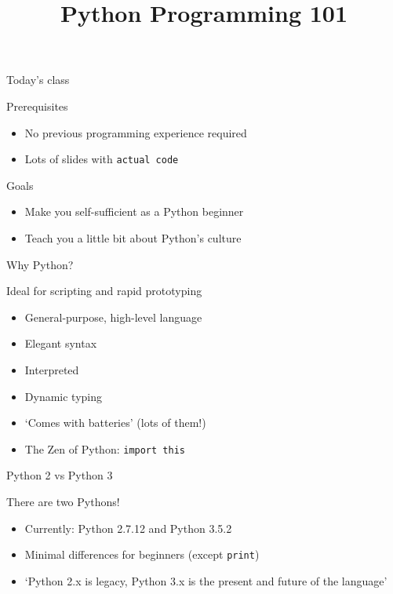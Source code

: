 

\title{Python Programming 101}



\maketitle

\begin{frame}{Today's class}
    \begin{block}{Prerequisites}
        \begin{itemize}
            \item No previous programming experience required
            \item Lots of slides with \texttt{actual code}
        \end{itemize}
    \end{block}
    \vfill
    \begin{block}{Goals}
        \begin{itemize}
            \item Make you self\hyp{}sufficient as a Python beginner
            \item Teach you a little bit about Python's culture
        \end{itemize}
    \end{block}
\end{frame}

\begin{frame}[fragile]{Why Python?}
    \begin{block}{Ideal for scripting and rapid prototyping}
        \begin{itemize}
            \item General\hyp{}purpose, high\hyp{}level language
            \item Elegant syntax
            \item Interpreted
            \item Dynamic typing
            \item `Comes with batteries' (lots of them!)
            \item The Zen of Python: \texttt{import this}
        \end{itemize}
    \end{block}
\end{frame}

\begin{frame}{Python 2 vs Python 3}
    \begin{block}{There are two Pythons!}
        \begin{itemize}
            \item Currently: Python 2.7.12 and Python 3.5.2
            \item Minimal differences for beginners
                  (except \texttt{print})
            \item `Python 2.x is legacy, Python 3.x is the present and future of
                   the language'
        \end{itemize}
    \end{block}
\end{frame}

